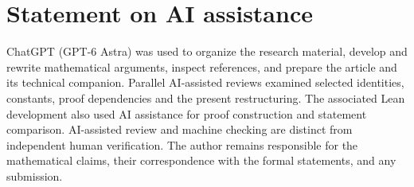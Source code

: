 \section*{Statement on AI assistance}
ChatGPT (GPT-6 Astra) was used to organize the research material,
develop and rewrite mathematical arguments, inspect references,
and prepare the article and its technical companion.
Parallel AI-assisted reviews examined selected identities, constants,
proof dependencies and the present restructuring. The associated
Lean development also used AI assistance for proof construction and
statement comparison. AI-assisted review and machine checking are
distinct from independent human verification. The author remains
responsible for the mathematical claims, their correspondence with
the formal statements, and any submission.
